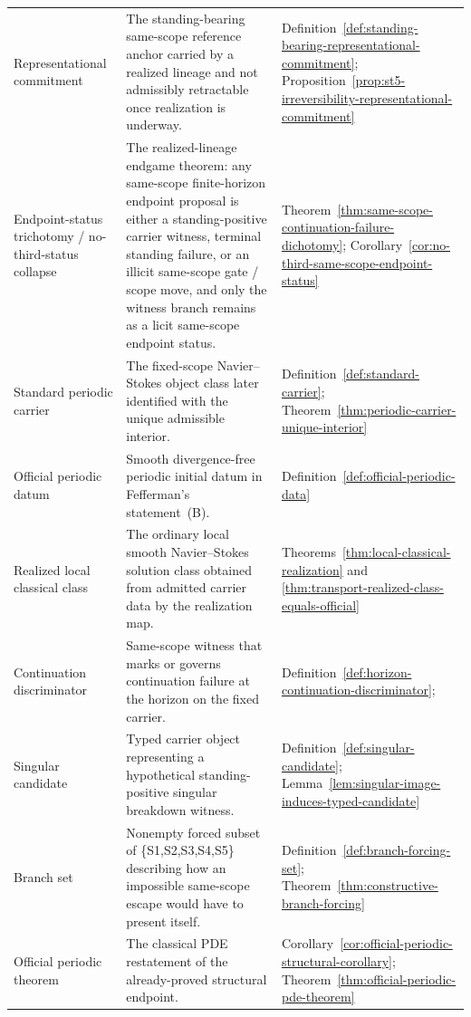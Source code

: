 \begin{tcolorbox}[title={Compact glossary and PDE-language crosswalk (continued)}, colback=green!2!white, colframe=green!45!black, boxsep=1pt, left=2pt, right=2pt, top=2pt, bottom=2pt]
\begin{tabularx}{\textwidth}{@{}L{0.22\textwidth}L{0.35\textwidth}Y@{}}
Representational commitment & The standing-bearing same-scope reference anchor carried by a realized lineage and not admissibly retractable once realization is underway. & Definition~\ref{def:standing-bearing-representational-commitment}; Proposition~\ref{prop:st5-irreversibility-representational-commitment}\\
Endpoint-status trichotomy / no-third-status collapse & The realized-lineage endgame theorem: any same-scope finite-horizon endpoint proposal is either a standing-positive carrier witness, terminal standing failure, or an illicit same-scope gate / scope move, and only the witness branch remains as a licit same-scope endpoint status. & Theorem~\ref{thm:same-scope-continuation-failure-dichotomy}; Corollary~\ref{cor:no-third-same-scope-endpoint-status}\\
Standard periodic carrier & The fixed-scope Navier--Stokes object class later identified with the unique admissible interior. & Definition~\ref{def:standard-carrier}; Theorem~\ref{thm:periodic-carrier-unique-interior}\\
Official periodic datum & Smooth divergence-free periodic initial datum in Fefferman's statement~(B). & Definition~\ref{def:official-periodic-data}\\
Realized local classical class & The ordinary local smooth Navier--Stokes solution class obtained from admitted carrier data by the realization map. & Theorems~\ref{thm:local-classical-realization} and \ref{thm:transport-realized-class-equals-official}\\
Continuation discriminator & Same-scope witness that marks or governs continuation failure at the horizon on the fixed carrier. & Definition~\ref{def:horizon-continuation-discriminator}; \HorizonDetectabilityRef{}\\
Singular candidate & Typed carrier object representing a hypothetical standing-positive singular breakdown witness. & Definition~\ref{def:singular-candidate}; Lemma~\ref{lem:singular-image-induces-typed-candidate}\\
Branch set & Nonempty forced subset of \{S1,S2,S3,S4,S5\} describing how an impossible same-scope escape would have to present itself. & Definition~\ref{def:branch-forcing-set}; Theorem~\ref{thm:constructive-branch-forcing}\\
Official periodic theorem & The classical PDE restatement of the already-proved structural endpoint. & Corollary~\ref{cor:official-periodic-structural-corollary}; Theorem~\ref{thm:official-periodic-pde-theorem}\\
\bottomrule
\end{tabularx}
\end{tcolorbox}

